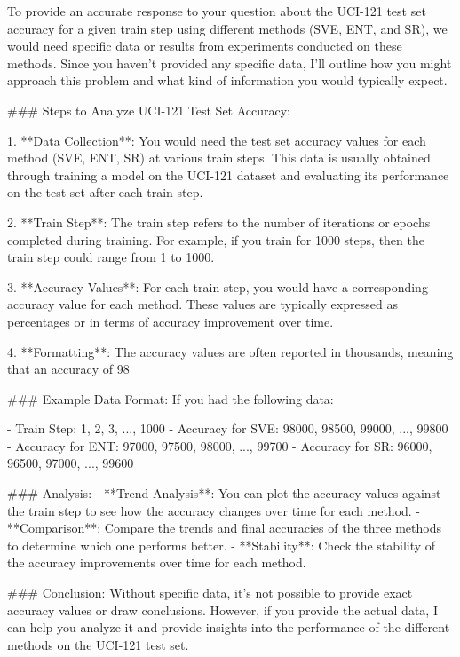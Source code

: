 To provide an accurate response to your question about the UCI-121 test set accuracy for a given train step using different methods (SVE, ENT, and SR), we would need specific data or results from experiments conducted on these methods. Since you haven't provided any specific data, I'll outline how you might approach this problem and what kind of information you would typically expect.

### Steps to Analyze UCI-121 Test Set Accuracy:

1. **Data Collection**: You would need the test set accuracy values for each method (SVE, ENT, SR) at various train steps. This data is usually obtained through training a model on the UCI-121 dataset and evaluating its performance on the test set after each train step.

2. **Train Step**: The train step refers to the number of iterations or epochs completed during training. For example, if you train for 1000 steps, then the train step could range from 1 to 1000.

3. **Accuracy Values**: For each train step, you would have a corresponding accuracy value for each method. These values are typically expressed as percentages or in terms of accuracy improvement over time.

4. **Formatting**: The accuracy values are often reported in thousands, meaning that an accuracy of 98%

### Example Data Format:
If you had the following data:

- Train Step: 1, 2, 3, ..., 1000
- Accuracy for SVE: 98000, 98500, 99000, ..., 99800
- Accuracy for ENT: 97000, 97500, 98000, ..., 99700
- Accuracy for SR: 96000, 96500, 97000, ..., 99600

### Analysis:
- **Trend Analysis**: You can plot the accuracy values against the train step to see how the accuracy changes over time for each method.
- **Comparison**: Compare the trends and final accuracies of the three methods to determine which one performs better.
- **Stability**: Check the stability of the accuracy improvements over time for each method.

### Conclusion:
Without specific data, it's not possible to provide exact accuracy values or draw conclusions. However, if you provide the actual data, I can help you analyze it and provide insights into the performance of the different methods on the UCI-121 test set.